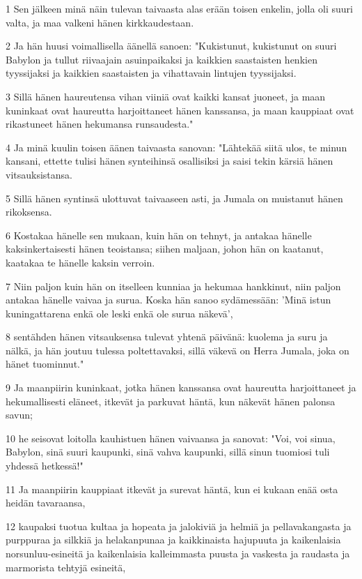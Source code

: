 \par 1 Sen jälkeen minä näin tulevan taivaasta alas erään toisen enkelin, jolla oli suuri valta, ja maa valkeni hänen kirkkaudestaan.
\par 2 Ja hän huusi voimallisella äänellä sanoen: "Kukistunut, kukistunut on suuri Babylon ja tullut riivaajain asuinpaikaksi ja kaikkien saastaisten henkien tyyssijaksi ja kaikkien saastaisten ja vihattavain lintujen tyyssijaksi.
\par 3 Sillä hänen haureutensa vihan viiniä ovat kaikki kansat juoneet, ja maan kuninkaat ovat haureutta harjoittaneet hänen kanssansa, ja maan kauppiaat ovat rikastuneet hänen hekumansa runsaudesta."
\par 4 Ja minä kuulin toisen äänen taivaasta sanovan: "Lähtekää siitä ulos, te minun kansani, ettette tulisi hänen synteihinsä osallisiksi ja saisi tekin kärsiä hänen vitsauksistansa.
\par 5 Sillä hänen syntinsä ulottuvat taivaaseen asti, ja Jumala on muistanut hänen rikoksensa.
\par 6 Kostakaa hänelle sen mukaan, kuin hän on tehnyt, ja antakaa hänelle kaksinkertaisesti hänen teoistansa; siihen maljaan, johon hän on kaatanut, kaatakaa te hänelle kaksin verroin.
\par 7 Niin paljon kuin hän on itselleen kunniaa ja hekumaa hankkinut, niin paljon antakaa hänelle vaivaa ja surua. Koska hän sanoo sydämessään: 'Minä istun kuningattarena enkä ole leski enkä ole surua näkevä',
\par 8 sentähden hänen vitsauksensa tulevat yhtenä päivänä: kuolema ja suru ja nälkä, ja hän joutuu tulessa poltettavaksi, sillä väkevä on Herra Jumala, joka on hänet tuominnut."
\par 9 Ja maanpiirin kuninkaat, jotka hänen kanssansa ovat haureutta harjoittaneet ja hekumallisesti eläneet, itkevät ja parkuvat häntä, kun näkevät hänen palonsa savun;
\par 10 he seisovat loitolla kauhistuen hänen vaivaansa ja sanovat: "Voi, voi sinua, Babylon, sinä suuri kaupunki, sinä vahva kaupunki, sillä sinun tuomiosi tuli yhdessä hetkessä!"
\par 11 Ja maanpiirin kauppiaat itkevät ja surevat häntä, kun ei kukaan enää osta heidän tavaraansa,
\par 12 kaupaksi tuotua kultaa ja hopeata ja jalokiviä ja helmiä ja pellavakangasta ja purppuraa ja silkkiä ja helakanpunaa ja kaikkinaista hajupuuta ja kaikenlaisia norsunluu-esineitä ja kaikenlaisia kalleimmasta puusta ja vaskesta ja raudasta ja marmorista tehtyjä esineitä,
